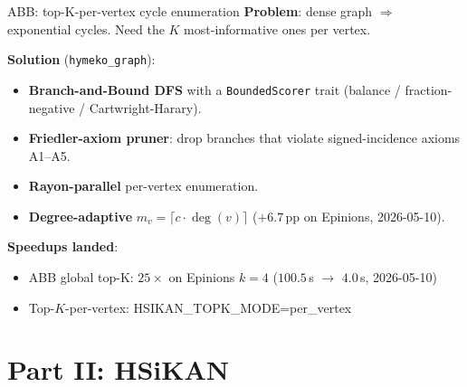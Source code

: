 \documentclass[aspectratio=169, 11pt]{beamer}
\begin{document}
\begin{frame}{ABB: top-K-per-vertex cycle enumeration}
  \textbf{Problem}: dense graph $\Rightarrow$ exponential cycles. Need
  the $K$ most-informative ones per vertex.

  \vspace{2mm}
  \textbf{Solution} (\texttt{hymeko\_graph}):
  \begin{itemize}
  \item \textbf{Branch-and-Bound DFS} with a \texttt{BoundedScorer} trait
        (balance / fraction-negative / Cartwright-Harary).
  \item \textbf{Friedler-axiom pruner}: drop branches that violate
        signed-incidence axioms A1--A5.
  \item \textbf{Rayon-parallel} per-vertex enumeration.
  \item \textbf{Degree-adaptive} $m_v = \lceil c \cdot \deg(v) \rceil$
        ($+6.7$\,pp on Epinions, 2026-05-10).
  \end{itemize}

  \vspace{2mm}
  \textbf{Speedups landed}:
  \begin{itemize}
  \item ABB global top-K: $25\times$ on Epinions $k=4$ ($100.5$\,s
        $\to$ $4.0$\,s, 2026-05-10)
  \item Top-$K$-per-vertex: HSIKAN\_TOPK\_MODE=per\_vertex
  \end{itemize}
\end{frame}

\section{Part II: HSiKAN}
\end{document}
